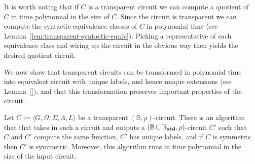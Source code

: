 \documentclass[../paper.tex]{subfiles}
\begin{document}
It is worth noting that if $C$ is a transparent circuit we can compute a
quotient of $C$ in time polynomial in the size of $C$. Since the circuit is
transparent we can compute the syntactic-equivalence classes of $C$ in
polynomial time (see Lemma~\ref{lem:transparent-syntactic-equiv}). Picking a
representative of each equivalence class and wiring up the circuit in the
obvious way then yields the desired quotient circuit.

We now show that transparent circuits can be transformed in polynomial time into
equivalent circuit with unique labels, and hence unique extensions (see
Lemma~\ref{}), and that this transformation preserves important properties of
the circuit.

\begin{lem}
  Let $C := \langle G, \Omega, \Sigma, \Lambda, L \rangle$ be a transparent
  $(\mathbb{B}, \rho)$-circuit. There is an algorithm that that takes in such a
  circuit and outputs a $(\mathbb{B} \cup \mathbb{B}_{\text{\textbf{std}}}, \rho)$-circuit $C'$
  such that $C$ and $C'$ compute the same function, $C'$ has unique labels, and
  if $C$ is symmetric then $C'$ is symmetric. Moreover, this algorithm runs in
  time polynomial in the size of the input circuit.
  \label{lem:transparent-unique}
\end{lem}
\end{document}
